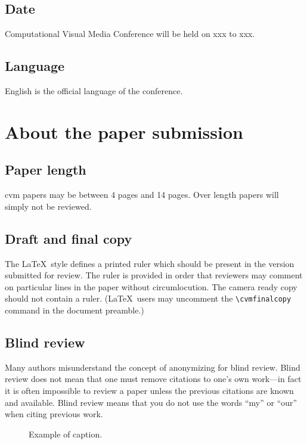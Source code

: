 \documentclass[10pt,twocolumn,letterpaper]{article}
\begin{document}
\subsection{Date}
Computational Visual Media Conference will be held on xxx to xxx.

\subsection{Language}
English is the official language of the conference.

\section{About the paper submission}

\subsection{Paper length}
cvm papers may be between 4 pages and 14 pages. Over length papers will simply not be reviewed.

\subsection{Draft and final copy}
The \LaTeX\ style defines a printed ruler which should be present in the
version submitted for review.  The ruler is provided in order that
reviewers may comment on particular lines in the paper without
circumlocution. The camera ready copy should not contain a ruler.
(\LaTeX\ users may uncomment the \verb'\cvmfinalcopy' command in the document preamble.)

\subsection{Blind review}
Many authors misunderstand the concept of anonymizing for blind
review.  Blind review does not mean that one must remove
citations to one's own work---in fact it is often impossible to
review a paper unless the previous citations are known and
available.
Blind review means that you do not use the words ``my'' or ``our''
when citing previous work.

\begin{figure}[t]
\begin{center}
\fbox{\rule{0pt}{2in} \rule{0.9\linewidth}{0pt}}
\end{center}
   \caption{Example of caption.  }
\label{fig:long}
\label{fig:onecol}
\end{figure}
\end{document}
